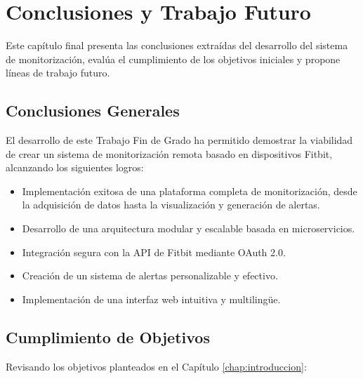 \chapter{Conclusiones y Trabajo Futuro}
\label{chap:conclusiones}

Este capítulo final presenta las conclusiones extraídas del desarrollo del sistema de monitorización, evalúa el cumplimiento de los objetivos iniciales y propone líneas de trabajo futuro.

\section{Conclusiones Generales}
\label{sec:conclusiones_generales}

El desarrollo de este Trabajo Fin de Grado ha permitido demostrar la viabilidad de crear un sistema de monitorización remota basado en dispositivos Fitbit\textsuperscript{\textregistered}, alcanzando los siguientes logros:

\begin{itemize}
    \item Implementación exitosa de una plataforma completa de monitorización, desde la adquisición de datos hasta la visualización y generación de alertas.
    \item Desarrollo de una arquitectura modular y escalable basada en microservicios.
    \item Integración segura con la API de Fitbit\textsuperscript{\textregistered} mediante OAuth 2.0.
    \item Creación de un sistema de alertas personalizable y efectivo.
    \item Implementación de una interfaz web intuitiva y multilingüe.
\end{itemize}

\section{Cumplimiento de Objetivos}
\label{sec:cumplimiento_objetivos}

Revisando los objetivos planteados en el Capítulo \ref{chap:introduccion}:

